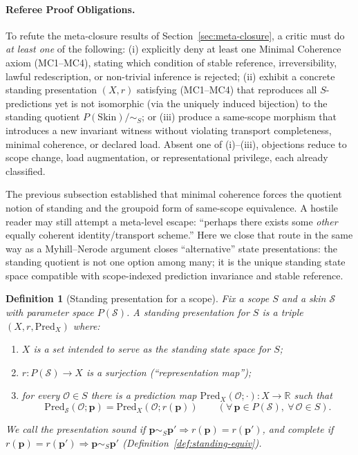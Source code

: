 \documentclass[11pt]{article}
\newtheorem{definition}{Definition}[section]
\theoremstyle{remark}
\newcommand{\Skin}{\mathcal{S}}
\begin{document}
\paragraph{Referee Proof Obligations.}
To refute the meta-closure results of Section~\ref{sec:meta-closure}, a critic must do \emph{at least one} of the following:
(i) explicitly deny at least one Minimal Coherence axiom (MC1--MC4), stating which condition of stable reference, irreversibility, lawful redescription, or non-trivial inference is rejected;
(ii) exhibit a concrete standing presentation $(X,r)$ satisfying (MC1--MC4) that reproduces all $S$-predictions yet is not isomorphic (via the uniquely induced bijection) to the standing quotient $P(\mathrm{Skin})/\!\sim_S$;
or (iii) produce a same-scope morphism that introduces a new invariant witness without violating transport completeness, minimal coherence, or declared load.
Absent one of (i)--(iii), objections reduce to scope change, load augmentation, or representational privilege, each already classified.

The previous subsection established that minimal coherence forces the quotient notion of standing and the
groupoid form of same-scope equivalence. A hostile reader may still attempt a meta-level escape:
``perhaps there exists some \emph{other} equally coherent identity/transport scheme.''
Here we close that route in the same way as a Myhill--Nerode argument closes ``alternative'' state
presentations: the standing quotient is not one option among many; it is the unique standing state space
compatible with scope-indexed prediction invariance and stable reference.

\begin{definition}[Standing presentation for a scope]\label{def:standing-presentation}
Fix a scope $S$ and a skin $\Skin$ with parameter space $P(\Skin)$.
A \emph{standing presentation} for $S$ is a triple $(X,r,\mathrm{Pred}_X)$ where:
\begin{enumerate}[label=(\roman*),leftmargin=2.2em]
\item $X$ is a set intended to serve as the standing state space for $S$;
\item $r:P(\Skin)\to X$ is a surjection (``representation map'');
\item for every $\mathcal{O}\in S$ there is a prediction map
$\mathrm{Pred}_X(\mathcal{O};\cdot):X\to\mathbb{R}$ such that
\begin{equation}\label{eq:standing-presentation}
\mathrm{Pred}_{\Skin}(\mathcal{O};\mathbf{p})=\mathrm{Pred}_X(\mathcal{O};r(\mathbf{p}))
\qquad (\forall\,\mathbf{p}\in P(\Skin),\ \forall\,\mathcal{O}\in S).
\end{equation}
\end{enumerate}
We call the presentation \emph{sound} if $\mathbf{p}\sim_S\mathbf{p}'\Rightarrow r(\mathbf{p})=r(\mathbf{p}')$,
and \emph{complete} if $r(\mathbf{p})=r(\mathbf{p}')\Rightarrow \mathbf{p}\sim_S\mathbf{p}'$
(Definition~\ref{def:standing-equiv}).
\end{definition}
\end{document}
